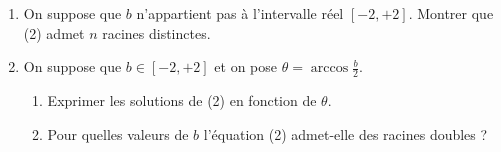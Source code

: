 \begin{enumerate}
\begin{enumerate}
\item  R{\'e}soudre l'{\'e}quation (1). V{\'e}rifier qu'elle admet $n$
solutions distinctes. Class{\'e}es par ordre \emph{d{\'e}croissant}, elles seront not{\'e}es $x_{n,k}$ ; $k$ variant de 0 {\`a} $n-1$:
\[
x_{n,0}\geq x_{n,1}\geq \cdots \geq x_{n,k}\geq \cdots \geq x_{n,n-1}
\]

\item  On suppose $n\geq 2$, montrer que
\[
\forall k\in \left\{ 0,\ldots ,n-2\right\} ,\mathrm{ }x_{n,k}>x_{n-1,k}>x_{n,k+1}
\]
\end{enumerate}


Etant donn{\'e} un nombre complexe $b$, on consid{\`e}re, pour tout entier $n\geq 2$, l'{\'e}quation polynomiale dans $\Bbb{C}$
\begin{equation}
\tilde{P}_{n}(x)=b
\end{equation}

\item On suppose que $b$ n'appartient pas {\`a} l'intervalle r{\'e}el $\left[ -2,+2\right] $. Montrer que (2) admet $n$ racines distinctes.

\item On suppose que $b\in \left[ -2,+2\right] $ et on pose $\theta=\arccos \frac{b}{2}$.

\begin{enumerate}
\item  Exprimer les solutions de (2) en fonction de $\theta $.

\item  Pour quelles valeurs de $b$ l'{\'e}quation (2) admet-elle des racines doubles ?
\end{enumerate}
\end{enumerate}
